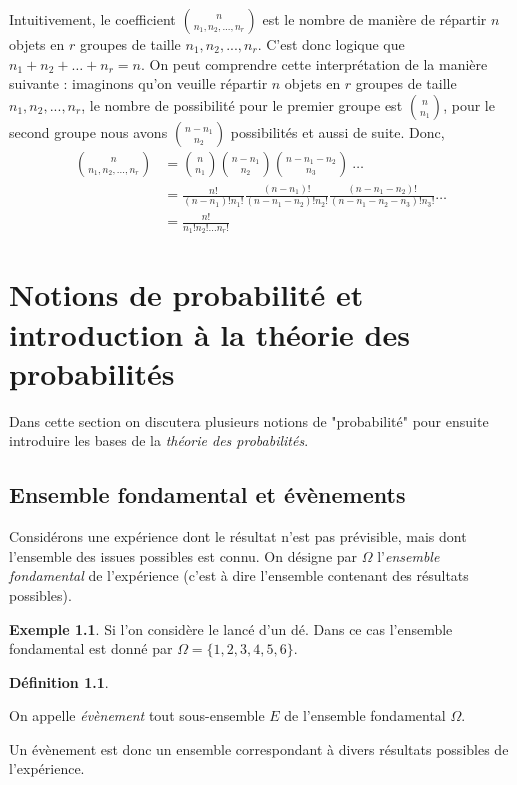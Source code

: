 \documentclass[a4paper,12pt]{report}
\theoremstyle{definition}
\renewcommand{\(}{\left(}
\renewcommand{\)}{\right)}
\renewcommand{\d}{\textit}
\newtheorem{defn}[thm]{Définition}
\newtheorem{exmp}[thm]{Exemple}
\begin{document}
    Intuitivement, le coefficient ${n \choose n_1, n_2, ..., n_r}$ est le nombre de manière de répartir $n$ objets en $r$ groupes de taille $n_1, n_2, ..., n_r$. C'est donc logique que $n_1+n_2+\dots+n_r = n$. On peut comprendre cette interprétation de la manière suivante : imaginons qu'on veuille répartir $n$ objets en $r$ groupes de taille $n_1, n_2, ..., n_r$, le nombre de possibilité pour le premier groupe est ${n\choose n_1}$, pour le second groupe nous avons ${n-n_1\choose n_2}$ possibilités et aussi de suite. Donc,
    \begin{align*}
        {n \choose n_1, n_2, ..., n_r} &= {n\choose n_1}{n-n_1 \choose n_2}{n-n_1-n_2\choose n_3}~\dots \\
        &= \frac{n!}{(n-n_1)!n_1!}\frac{(n-n_1)!}{(n-n_1-n_2)!n_2!}\frac{(n-n_1-n_2)!}{(n-n_1-n_2-n_3)!n_3!}\dots \\
        &= \frac{n!}{n_1!n_2!\dots n_r!}
    \end{align*}

\chapter{Notions de probabilité et introduction à la théorie des probabilités}

    Dans cette section on discutera plusieurs notions de "probabilité" pour ensuite introduire les bases de la \d{théorie des probabilités}.

    \section{Ensemble fondamental et évènements}
    Considérons une expérience dont le résultat n'est pas prévisible, mais dont l'ensemble des issues possibles est connu. On désigne par $\Omega$ l'\textit{ensemble fondamental} de l'expérience (c'est à dire l'ensemble contenant des résultats possibles).
    
    \begin{exmp}
        Si l'on considère le lancé d'un dé. Dans ce cas l'ensemble fondamental est donné par $\Omega = \{1,2,3,4,5,6\}$.
    \end{exmp}
    
    \begin{defn}
    \begin{leftbar}
        On appelle \textit{évènement} tout sous-ensemble $E$ de l'ensemble fondamental $\Omega$.
    \end{leftbar}
    \end{defn}
    Un évènement est donc un ensemble correspondant à divers résultats possibles de l'expérience.
    
\end{document}
